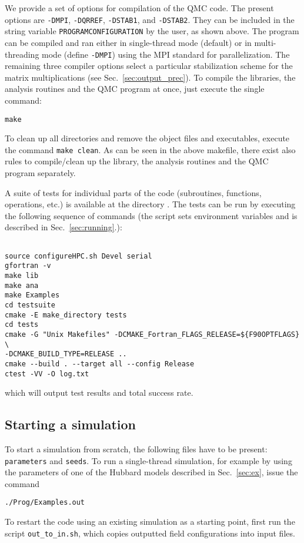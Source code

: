 We provide a set of options for compilation of the QMC code. The present options are \texttt{-DMPI}, \texttt{-DQRREF}, \texttt{-DSTAB1}, and \texttt{-DSTAB2}. 
They can be included in the string variable \texttt{PROGRAMCONFIGURATION} by the user, as shown above.
The program can be compiled and ran either in single-thread mode (default) or 
in multi-threading mode (define \texttt{-DMPI}) using the MPI standard for parallelization. The remaining three compiler options select a particular stabilization scheme for the matrix multiplications (see Sec.~\ref{sec:output_prec}).
To compile the libraries, the analysis routines and the QMC program at once, just execute the single command:
\begin{verbatim}
make
\end{verbatim}
To clean up all directories and remove the object files and executables, execute the command \texttt{make clean}. As can be seen in the above makefile, there exist also rules to compile/clean up the library, the analysis routines and the QMC program separately.  


A suite of tests for individual parts of the code (subroutines, functions, operations, etc.) is available at the directory . The tests can be run by executing the following sequence of commands (the script  sets environment variables and is described in Sec.~\ref{sec:running}.):
\begin{lstlisting}[style=bash,morekeywords={make,cmake,ctest}]

source configureHPC.sh Devel serial
gfortran -v
make lib
make ana
make Examples
cd testsuite
cmake -E make_directory tests
cd tests
cmake -G "Unix Makefiles" -DCMAKE_Fortran_FLAGS_RELEASE=${F90OPTFLAGS} \
-DCMAKE_BUILD_TYPE=RELEASE ..
cmake --build . --target all --config Release
ctest -VV -O log.txt
\end{lstlisting}
which will output test results and total success rate.

%
\subsection{Starting a simulation}
%
To start a simulation from scratch, the following files have to be present: \texttt{parameters} and \texttt{seeds}. 
To run a single-thread simulation, for example by using the parameters of one of the  Hubbard models described in Sec.~\ref{sec:ex}, issue the command
\begin{verbatim}
./Prog/Examples.out
\end{verbatim}
To restart the code using an existing simulation as a starting point, first run the script \texttt{out\_to\_in.sh}, which copies outputted field configurations into input files.
%
